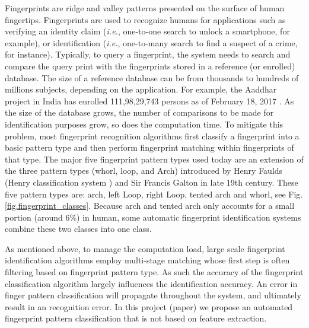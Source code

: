

Fingerprints are ridge and valley patterns presented on the surface of human fingertips.
%
Fingerprints are used to recognize humans for applications such as verifying an identity claim (\textit{i.e.}, one-to-one search to  unlock a smartphone, for example), or identification (\textit{i.e.}, one-to-many search to find a suspect of a crime, for instance).
%
Typically, to query a fingerprint, the system needs to search and compare the query print with the fingerprints stored in a reference (or enrolled) database.  The size of a reference database can be from thousands to hundreds of millions subjects, depending on the application. For example, the Aaddhar project in India has enrolled 111,98,29,743 persons as of February 18, 2017 \cite{aaddhaar}.  
%
As the size of the database grows, the number of comparisons to be made for identification purposes grow, so does the computation time.
%
To mitigate this problem, most fingerprint recognition algorithms first classify a fingerprint into a basic pattern type and then perform fingerprint matching within fingerprints of that type.
%
The major five fingerprint pattern types used today are an extension of the three pattern types (whorl, loop, and Arch) introduced by Henry Faulds (Henry classification system \cite{henry1905classification}) and Sir Francis Galton \cite{galton1892} in late 19th century. These five pattern types are: arch, left Loop, right Loop, tented arch and whorl, see Fig.\ref{fig.fingerprint_classes}.  
%
Because arch and tented arch only accounts for a small portion (around 6\%) in human, some automatic fingerprint identification systems combine these two classes into one class. 

As mentioned above, to manage the computation load, large scale fingerprint identification algorithms employ multi-stage matching whose first step is often filtering based on fingerprint pattern type. As such the accuracy of the fingerprint classification algorithm largely influences the identification accuracy. An error in finger pattern classification will propagate throughout the system, and ultimately result in an recognition error. In this project (paper) we propose an automated fingerprint pattern classification that is not based on feature extraction.

